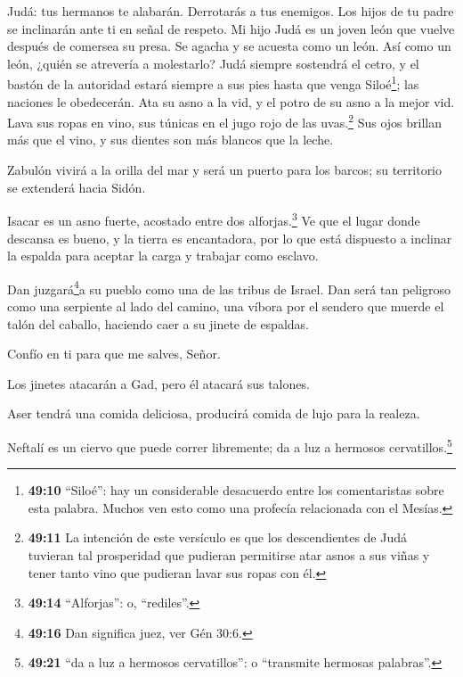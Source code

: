  Judá: tus hermanos te alabarán. Derrotarás a tus enemigos.
Los hijos de tu padre se inclinarán ante ti en señal de respeto.
 Mi hijo Judá es un joven león que vuelve después de
comersea su presa. Se agacha y se acuesta como un león. Así como un
león, ¿quién se atrevería a molestarlo?  Judá siempre
sostendrá el cetro, y el bastón de la autoridad estará siempre a sus
pies hasta que venga Siloé\footnote{\textbf{49:10} ``Siloé'': hay un
  considerable desacuerdo entre los comentaristas sobre esta palabra.
  Muchos ven esto como una profecía relacionada con el Mesías.}; las
naciones le obedecerán.  Ata su asno a la vid, y el potro
de su asno a la mejor vid. Lava sus ropas en vino, sus túnicas en el
jugo rojo de las uvas.\footnote{\textbf{49:11} La intención de este
  versículo es que los descendientes de Judá tuvieran tal prosperidad
  que pudieran permitirse atar asnos a sus viñas y tener tanto vino que
  pudieran lavar sus ropas con él.}  Sus ojos brillan más
que el vino, y sus dientes son más blancos que la leche.

 Zabulón vivirá a la orilla del mar y será un puerto para
los barcos; su territorio se extenderá hacia Sidón.

 Isacar es un asno fuerte, acostado entre dos
alforjas.\footnote{\textbf{49:14} ``Alforjas'': o, ``rediles''.}
 Ve que el lugar donde descansa es bueno, y la tierra es
encantadora, por lo que está dispuesto a inclinar la espalda para
aceptar la carga y trabajar como esclavo.

 Dan juzgará\footnote{\textbf{49:16} Dan significa juez,
  ver Gén 30:6.}a su pueblo como una de las tribus de Israel.
 Dan será tan peligroso como una serpiente al lado del
camino, una víbora por el sendero que muerde el talón del caballo,
haciendo caer a su jinete de espaldas.

 Confío en ti para que me salves, Señor.

 Los jinetes atacarán a Gad, pero él atacará sus talones.

 Aser tendrá una comida deliciosa, producirá comida de lujo
para la realeza.

 Neftalí es un ciervo que puede correr libremente; da a luz
a hermosos cervatillos.\footnote{\textbf{49:21} ``da a luz a hermosos
  cervatillos'': o ``transmite hermosas palabras''.}

